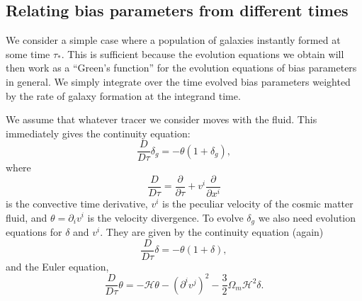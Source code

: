 \documentclass[11pt]{book}
\begin{document}
\subsection{Relating bias parameters from different times}
We consider a simple case where a population of galaxies instantly formed at some time $\tau_*$. This is sufficient because the evolution equations we obtain will then work as a ``Green's function'' for the evolution equations of bias parameters in general. We simply integrate over the time evolved bias parameters weighted by the rate of galaxy formation at the integrand time.

We assume that whatever tracer we consider moves with the fluid. This immediately gives the continuity equation:
\begin{equation}
    \frac{D}{D\tau}\delta_g = -\theta(1+\delta_g),
    \label{eq:conteqtracer}
\end{equation}
where
\begin{equation}
    \frac{D}{D\tau} = \frac{\partial}{\partial \tau} + v^i\frac{\partial}{\partial x^i}
\end{equation}
is the convective time derivative, $v^i$ is the peculiar velocity of the cosmic matter fluid, and $\theta=\partial_i v^i$ is the velocity divergence. %
To evolve $\delta_g$ we also need evolution equations for $\delta$ and $v^i$. They are given by the continuity equation (again)
\begin{equation}
    \frac{D}{D\tau}\delta = -\theta(1+\delta),
    \label{eq:conteq}
\end{equation}
and the Euler equation,
\begin{equation}
    \frac{D}{D\tau}\theta = -\mathcal H \theta - (\partial^iv^j)^2 - \frac{3}{2}\Omega_m\mathcal H^2\delta.
\end{equation}
\end{document}
